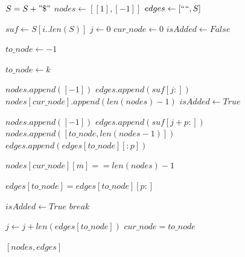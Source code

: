 \documentclass[letterpaper, 11pt]{article}
\begin{document}
\clearpage
\begin{algorithmic}[1]
\State $S = S + " \$ "$
\State $nodes \gets [[1], [-1]]$
\State $edges \gets [`` ``, S]$

\item[]
\State $suf \gets S[i..len(S)]$
\State $j \gets 0$
\State $cur\_node \gets 0$
\State $isAdded \gets False$

\item[]
\State $to\_node \gets -1$

\State $to\_node \gets k$
\EndIf
\EndFor

\item[]

\State $nodes.append([-1])$ 
\State $edges.append(suf[j:])$  
\State $nodes[cur\_node].append(len(nodes) - 1)$ 
\State $isAdded \gets True$
\Else
{}

\State $nodes.append([-1])$ 
\State $edges.append(suf[j + p:])$ 
\State $nodes.append([to\_node, len(nodes - 1)])$ 
\State $edges.append(edges[to\_node][:p])$ 

\item[]
\item[] 

    \State $nodes[cur\_node][m] == len(nodes) - 1$
  \EndIf
\EndFor

\State $edges[to\_node] = edges[to\_node][p:]$ 


\State $isAdded \gets True$
\State $break$
\EndIf

\EndFor

\State $j \gets j + len(edges[to\_node])$
\State $cur\_node = to\_node$

\EndIf

\EndWhile

\EndFor
\item[]
\State \Return $[nodes, edges]$
\EndProcedure
\end{algorithmic}


\clearpage
\end{document}
